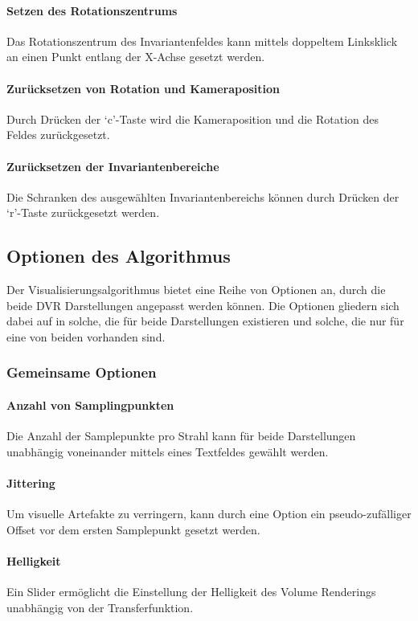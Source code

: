 \documentclass[a4paper,fontsize=12pt,toc=bib,halfparskip]{scrartcl}
\begin{document}
\paragraph{Setzen des Rotationszentrums}
Das Rotationszentrum des Invariantenfeldes kann mittels doppeltem Linksklick an einen Punkt entlang der X-Achse gesetzt werden.
\paragraph{Zur\"ucksetzen von Rotation und Kameraposition}
Durch Dr\"ucken der `c'-Taste wird die Kameraposition und die Rotation des Feldes zur\"uckgesetzt.
\paragraph{Zur\"ucksetzen der Invariantenbereiche}
Die Schranken des ausgew\"ahlten Invariantenbereichs k\"onnen durch Dr\"ucken der `r'-Taste zur\"uckgesetzt werden.

\subsection{Optionen des Algorithmus}

Der Visualisierungsalgorithmus bietet eine Reihe von Optionen an, durch die beide DVR Darstellungen angepasst werden k\"onnen. Die Optionen gliedern sich dabei auf in solche, die f\"ur beide Darstellungen existieren und solche, die nur f\"ur eine von beiden vorhanden sind. 

\subsubsection{Gemeinsame Optionen}

\paragraph{Anzahl von Samplingpunkten}
Die Anzahl der Samplepunkte pro Strahl kann f\"ur beide Darstellungen unabh\"angig voneinander mittels eines Textfeldes gew\"ahlt werden.

\paragraph{Jittering}
Um visuelle Artefakte zu verringern, kann durch eine Option ein pseudo-zuf\"alliger Offset vor dem ersten Samplepunkt gesetzt werden.

\paragraph{Helligkeit}
Ein Slider erm\"oglicht die Einstellung der Helligkeit des Volume Renderings unabh\"angig von der Transferfunktion.
\end{document}
